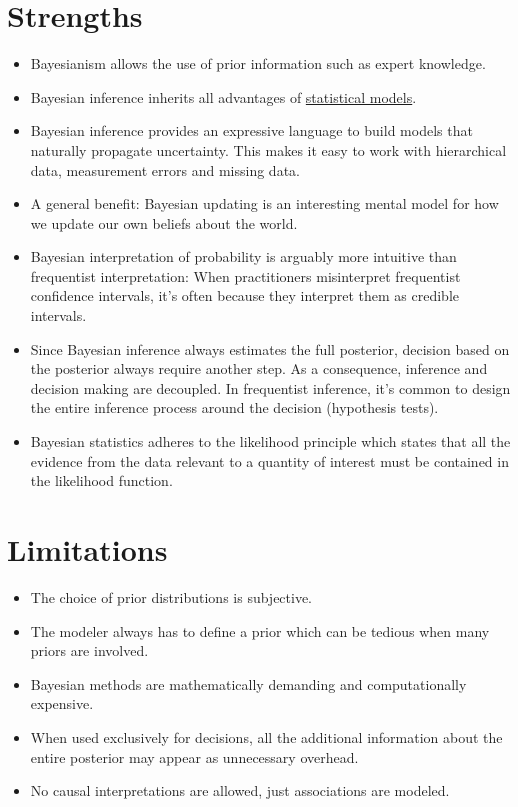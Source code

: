 \documentclass[
  10pt,
]{scrbook}
\providecommand{\tightlist}{%
  \setlength{\itemsep}{0pt}\setlength{\parskip}{0pt}}
\begin{document}
\hypertarget{strengths-2}{%
\section{Strengths}\label{strengths-2}}

\begin{itemize}
\tightlist
\item
  Bayesianism allows the use of prior information such as expert knowledge.
\item
  Bayesian inference inherits all advantages of \protect\hyperlink{statistical-modeling}{statistical models}.
\item
  Bayesian inference provides an expressive language to build models that naturally propagate uncertainty. This makes it easy to work with hierarchical data, measurement errors and missing data.
\item
  A general benefit: Bayesian updating is an interesting mental model for how we update our own beliefs about the world.
\item
  Bayesian interpretation of probability is arguably more intuitive than frequentist interpretation: When practitioners misinterpret frequentist confidence intervals, it's often because they interpret them as credible intervals.
\item
  Since Bayesian inference always estimates the full posterior, decision based on the posterior always require another step. As a consequence, inference and decision making are decoupled. In frequentist inference, it's common to design the entire inference process around the decision (hypothesis tests).
\item
  Bayesian statistics adheres to the likelihood principle which states that all the evidence from the data relevant to a quantity of interest must be contained in the likelihood function.
\end{itemize}

\hypertarget{limitations-2}{%
\section{Limitations}\label{limitations-2}}

\begin{itemize}
\tightlist
\item
  The choice of prior distributions is subjective.
\item
  The modeler always has to define a prior which can be tedious when many priors are involved.
\item
  Bayesian methods are mathematically demanding and computationally expensive.
\item
  When used exclusively for decisions, all the additional information about the entire posterior may appear as unnecessary overhead.
\item
  No causal interpretations are allowed, just associations are modeled.
\end{itemize}
\end{document}
